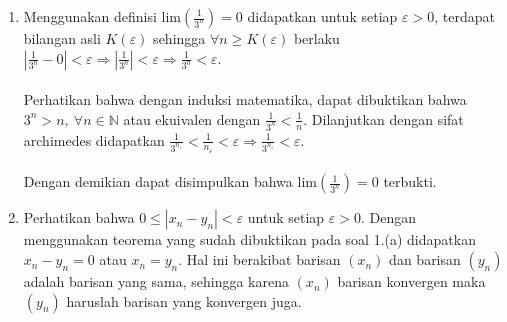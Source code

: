 \documentclass[10pt,openany,a4paper]{article}
\begin{document}
\begin{enumerate}
    \item Menggunakan definisi lim$(\frac{1}{3^n})=0$ didapatkan untuk setiap $\varepsilon>0$, terdapat bilangan asli $K(\varepsilon)$ sehingga $\forall n\geq K(\varepsilon)$ berlaku $|\frac{1}{3^n}-0|<\varepsilon\Rightarrow|\frac{1}{3^n}|<\varepsilon\Rightarrow\frac{1}{3^n}<\varepsilon$.\\~\\
    Perhatikan bahwa dengan induksi matematika, dapat dibuktikan bahwa $3^n>n,\:\forall n\in\mathbb{N}$ atau ekuivalen dengan $\frac{1}{3^n}<\frac{1}{n}$. Dilanjutkan dengan sifat archimedes didapatkan $\frac{1}{3^{n_\varepsilon}}<\frac{1}{n_\varepsilon}<\varepsilon\Rightarrow\frac{1}{3^{n_\varepsilon}}<\varepsilon$.\\~\\
    Dengan demikian dapat disimpulkan bahwa lim$(\frac{1}{3^n})=0$ terbukti.
    \vspace{1cm}

    \item Perhatikan bahwa $0\leq|x_n-y_n|<\varepsilon$ untuk setiap $\varepsilon>0$. Dengan menggunakan teorema yang sudah dibuktikan pada soal 1.(a) didapatkan $x_n-y_n=0$ atau $x_n=y_n$. Hal ini berakibat barisan $(x_n)$ dan barisan $(y_n)$ adalah barisan yang sama, sehingga karena $(x_n)$ barisan konvergen maka $(y_n)$ haruslah barisan yang konvergen juga.
\end{enumerate}
\end{document}
